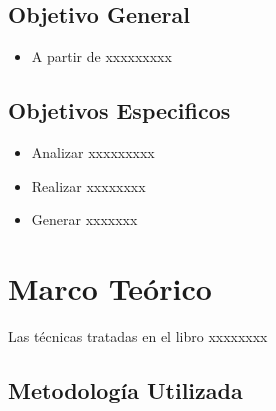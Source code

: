 \documentclass[12pt,a4paper,]{book}
\def\ifdoblecara{} %
\def\ifprincipal{} %
\providecommand{\tightlist}{%
  \setlength{\itemsep}{0pt}\setlength{\parskip}{0pt}}
\numberwithin{dummy}{section}
\theoremstyle{ocrenumbox}
\theoremstyle{ocrenumbox}
\theoremstyle{ocrenumbox}
\theoremstyle{ocrenumbox}
\theoremstyle{ocrenum}
\begin{document}
\hypertarget{objetivo-general}{%
\section{Objetivo General}\label{objetivo-general}}

\begin{itemize}
\tightlist
\item
  A partir de xxxxxxxxx
\end{itemize}

\hypertarget{objetivos-especificos}{%
\section{Objetivos Especificos}\label{objetivos-especificos}}

\begin{itemize}
\item
  Analizar xxxxxxxxx
\item
  Realizar xxxxxxxx
\item
  Generar xxxxxxx
\end{itemize}

\FloatBarrier

\ifdefined\ifprincipal
\else
\setlength{\parindent}{1em}
\pagestyle{fancy}
\setcounter{tocdepth}{4}
\tableofcontents

\fi

\ifdefined\ifdoblecara
\fancyhead{}{}
\fancyhead[LE,RO]{\scriptsize\rightmark}
\fancyfoot[LO,RE]{\scriptsize\slshape \leftmark}
\fancyfoot[C]{}
\fancyfoot[LE,RO]{\footnotesize\thepage}
\else
\fancyhead{}{}
\fancyhead[RO]{\scriptsize\rightmark}
\fancyfoot[LO]{\scriptsize\slshape \leftmark}
\fancyfoot[C]{}
\fancyfoot[RO]{\footnotesize\thepage}
\fi

\renewcommand{\headrulewidth}{0.4pt}
\renewcommand{\footrulewidth}{0.4pt}

\hypertarget{marco-teuxf3rico}{%
\chapter{Marco Teórico}\label{marco-teuxf3rico}}

Las técnicas tratadas en el libro \cite{AppliedMultiv2007} xxxxxxxx

\hypertarget{metodologuxeda-utilizada}{%
\section{Metodología Utilizada}\label{metodologuxeda-utilizada}}
\end{document}
